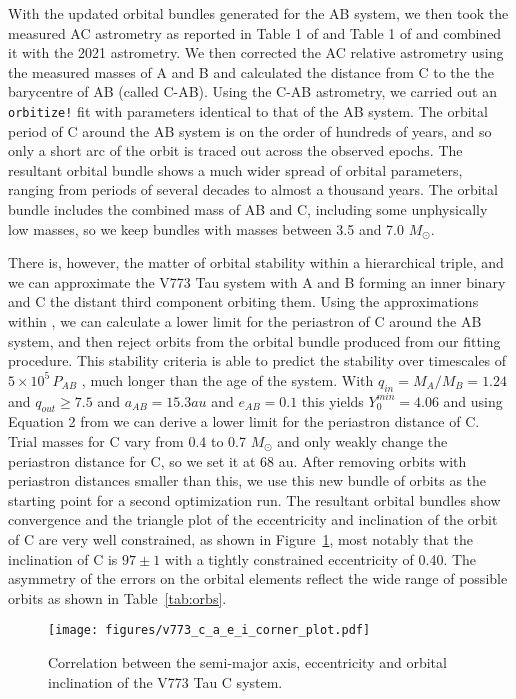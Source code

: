 \documentclass{aa}
\begin{document}
With the updated orbital bundles generated for the AB system, we then took the measured AC astrometry as reported in Table 1 of \citet{Duchene03} and Table 1 of \citet{Boden12} and combined it with the 2021 astrometry.
%
We then corrected the AC relative astrometry using the measured masses of A and B and calculated the distance from C to the the barycentre of AB (called C-AB).
%
Using the C-AB astrometry, we carried out an {\tt orbitize!} fit with parameters identical to that of the AB system.
%
The orbital period of C around the AB system is on the order of hundreds of years, and so only a short arc of the orbit is traced out across the observed epochs.
%
The resultant orbital bundle shows a much wider spread of orbital parameters, ranging from periods of several decades to almost a thousand years.
%
The orbital bundle includes the combined mass of AB and C, including some unphysically low masses, so we keep bundles with masses between 3.5 and 7.0 $M_\odot$.

There is, however, the matter of orbital stability within a hierarchical triple, and we can approximate the V773 Tau system with A and B forming an inner binary and C the distant third component orbiting them.
%
Using the approximations within \citet{Eggleton95}, we can calculate a lower limit for the periastron of C around the AB system, and then reject orbits from the orbital bundle produced from our fitting procedure. This stability criteria is able to predict the stability over timescales of $5\times 10^5\,P_{AB}$ \citep{He2018}, much longer than the age of the system.
% 
With $q_{in}=M_A/M_B=1.24$ and $q_{out}\geq 7.5$ and $a_{AB}=15.3au$ and $e_{AB} = 0.1$ this yields $Y^{min}_0=4.06$ and using Equation 2 from \citet{Eggleton95} we can derive a lower limit for the periastron distance of C.
%
Trial masses for C vary from 0.4 to 0.7 $M_\odot$ and only weakly change the periastron distance for C, so we set it at 68 au.
%
After removing orbits with periastron distances smaller than this, we use this new bundle of orbits as the starting point for a second optimization run.
%
The resultant orbital bundles show convergence and the triangle plot of the eccentricity and inclination of the orbit of C are very well constrained, as shown in Figure~\ref{fig:v773caei}, most notably that the inclination of C is $97\pm1$\degr{} with a tightly constrained eccentricity of 0.40.
%
The asymmetry of the errors on the orbital elements reflect the wide range of possible orbits as shown in Table~\ref{tab:orbs}.

\begin{figure}[ht]
\begin{center}
    \centering
    \texttt{[image: figures/v773\_c\_a\_e\_i\_corner\_plot.pdf]}
        \caption{Correlation between the semi-major axis, eccentricity and orbital inclination of the V773 Tau C system.
        }
    \label{fig:v773caei}

\end{center}
\end{figure}
\end{document}
